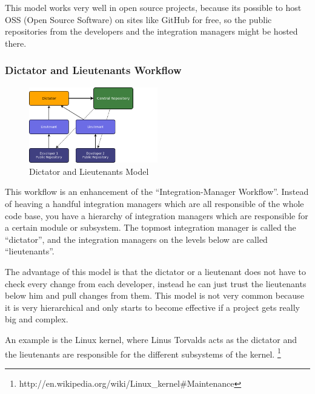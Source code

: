 This model works very well in open source projects, because its possible to host OSS (Open Source Software) on 
sites like GitHub for free, so the public repositories from the developers and the integration managers might be hosted there.


\subsubsection{Dictator and Lieutenants Workflow}

\begin{figure}[ht]
  \centering
  \includegraphics[width=0.5\textwidth]{img/Mod_Dictator}
  \caption{Dictator and Lieutenants Model}
  \label{fig:mod_dictator} 
\end{figure}

This workflow is an enhancement of the “Integration-Manager Workflow”. Instead of heaving a handful 
integration managers which are all responsible of the whole code base, you have a hierarchy of integration 
managers which are responsible for a certain module or subsystem. The topmost integration manager is called 
the “dictator”, and the integration managers on the levels below are called “lieutenants”.

The advantage of this model is that the dictator or a lieutenant does not have to check every change from 
each developer, instead he can just trust the lieutenants below him and pull changes from them. This model 
is not very common because it is very hierarchical and only starts to become effective if a project gets really big and complex.

An example is the Linux kernel, where Linus Torvalds acts as the dictator and the lieutenants are 
responsible for the different subsystems of the kernel. \footnote{http://en.wikipedia.org/wiki/Linux\_kernel\#Maintenance}
